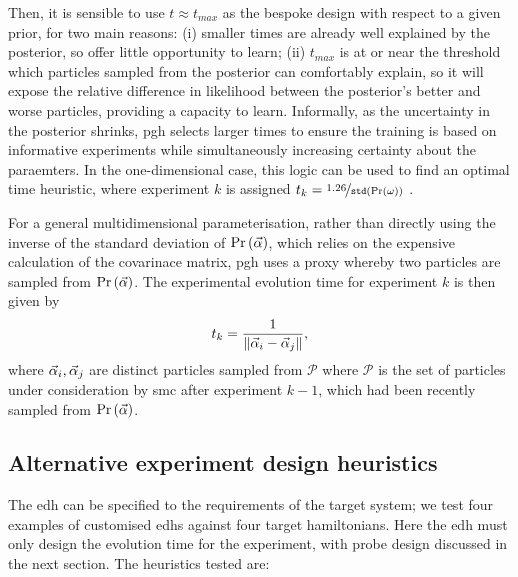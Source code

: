 Then, it is sensible to use $t \approx t_{max}$ as the bespoke design with respect to a given prior, 
    for two main reasons: 
    (i) smaller times are already well explained by the posterior, so offer little opportunity to learn;
    (ii) $t_{max}$ is at or near the threshold which \glspl{particle} sampled from the posterior can comfortably explain, 
        so it will expose the relative difference in \gls{likelihood} between the posterior's better and worse \glspl{particle}, 
        providing a capacity to learn. 
Informally, as the uncertainty in the posterior shrinks, \gls{pgh} selects larger times 
    to ensure the training is based on informative \glspl{experiment} while 
    simultaneously increasing certainty about the paraemters. 
In the one-dimensional case, this logic can be used to find an optimal time heuristic, 
    where \gls{experiment} $k$ is assigned $t_k = \nicefrac{1.26}{\texttt{std}\left(\Pr(\omega)\right)}$ \cite{ferrie2013best}. 
\par
For a general multidimensional parameterisation, 
    rather than directly using the inverse of the standard deviation of $\Pr \left(\vec{\alpha}\right)$, 
    which relies on the expensive calculation of the covarinace matrix, 
    \gls{pgh} uses a proxy whereby two \glspl{particle} are sampled from $\Pr \left(\vec{\alpha}\right)$. 
The experimental evolution time for \gls{experiment} $k$ is then given by 
\begin{equation}
    \label{eqn:pgh_time}
    t_k = \frac{1}{\| \vec{\alpha}_i - \vec{\alpha}_j \|}, 
\end{equation}
    where $\vec{\alpha}_i, \vec{\alpha}_j$ are distinct \glspl{particle} sampled from $\mathcal{P}$ where 
    $\mathcal{P}$ is the set of \glspl{particle} under consideration by \gls{smc} after \gls{experiment} $k-1$, 
    which had been recently sampled from $\Pr\left(\vec{\alpha}\right)$. 
\par 


\subsection{Alternative experiment design heuristics}\label{sec:alt_heuristics}
The \gls{edh} can be specified to the requirements of the target system; 
    we test four examples of customised \glspl{edh} against four target \glspl{hamiltonian}.
Here the \gls{edh} must only design the evolution time for the experiment, 
    with \gls{probe} design discussed in the next section. 
The heuristics tested are:

